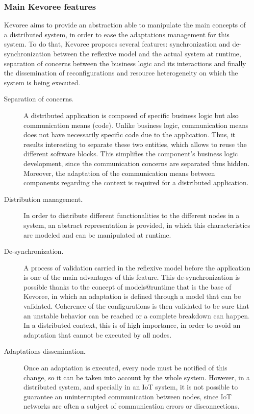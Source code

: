 \subsubsection{Main Kevoree features}
Kevoree aims to provide an abstraction able to manipulate the main concepts of a distributed system, in order to ease the adaptations management for this system.
To do that, Kevoree proposes several features: synchronization and de-synchronization between the reflexive model and the actual system at runtime, separation of concerns between the business logic and its interactions and finally the dissemination of reconfigurations and resource heterogeneity on which the system is being executed.
\begin{description}
	\item [Separation of concerns.] A distributed application is composed of specific business logic but also communication means (code).
	Unlike business logic, communication means does not have necessarily specific code due to the application.
	Thus, it results interesting to separate these two entities, which allows to reuse the different software blocks.
	This simplifies the component's business logic development, since the communication concerns are separated thus hidden.
	Moreover, the adaptation of the communication means between components regarding the context is required for a distributed application.
	\item [Distribution management.] In order to distribute different functionalities to the different nodes in a system, an abstract representation is provided, in which this characteristics are modeled and can be manipulated at runtime.
	\item [De-synchronization.] A process of validation carried in the reflexive model before the application is one of the main advantages of this feature.
	This de-synchronization is possible thanks to the concept of models@runtime that is the base of Kevoree, in which an adaptation is defined through a model that can be validated.
	Coherence of the configurations is then validated to be sure that an unstable behavior can be reached or a complete breakdown can happen.
	In a distributed context, this is of high importance, in order to avoid an adaptation that cannot be executed by all nodes.
	\item [Adaptations dissemination.] Once an adaptation is executed, every node must be notified of this change, so it can be taken into account by the whole system.
	However, in a distributed system, and specially in an IoT system, it is not possible to guarantee an uninterrupted communication between nodes, since IoT networks are often a subject of communication errors or disconnections.

\end{description}
